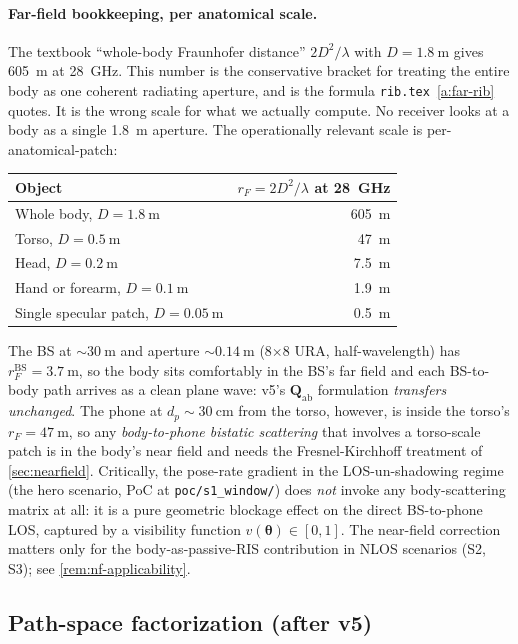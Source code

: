 \documentclass[11pt,a4paper]{article}
\theoremstyle{definition}
\newcommand{\Qabs}{\mathbf{Q}_{\mathrm{ab}}}
\newcommand{\thetab}{\bm{\theta}}
\begin{document}
\paragraph{Far-field bookkeeping, per anatomical scale.}  The
textbook ``whole-body Fraunhofer distance''
$2D^2/\lambda$ with $D=\SI{1.8}{\m}$ gives \SI{605}{\m} at
\SI{28}{\GHz}.  This number is the conservative bracket for treating
the entire body as one coherent radiating aperture, and is the
formula \texttt{rib.tex}~\cref{a:far-rib} quotes.  It is the wrong
scale for what we actually compute.  No receiver looks at a body as
a single \SI{1.8}{\m} aperture.  The operationally relevant scale
is per-anatomical-patch:
\begin{center}\small
\begin{tabular}{@{}lr@{}}
\toprule
Object & $r_F=2D^2/\lambda$ at \SI{28}{\GHz} \\
\midrule
Whole body, $D=\SI{1.8}{\m}$ & \SI{605}{\m} \\
Torso, $D=\SI{0.5}{\m}$       & \SI{47}{\m} \\
Head, $D=\SI{0.2}{\m}$        & \SI{7.5}{\m} \\
Hand or forearm, $D=\SI{0.1}{\m}$  & \SI{1.9}{\m} \\
Single specular patch, $D=\SI{0.05}{\m}$ & \SI{0.5}{\m} \\
\bottomrule
\end{tabular}
\end{center}
The BS at $\sim\SI{30}{\m}$ and aperture
$\sim\SI{0.14}{\m}$ (8$\times$8 URA, half-wavelength)
has $r_F^{\mathrm{BS}}=\SI{3.7}{\m}$, so the body sits comfortably
in the BS's far field and each BS-to-body path arrives as a clean
plane wave: v5's $\Qabs$ formulation \emph{transfers unchanged}.
The phone at $d_p\sim\SI{30}{\cm}$ from the torso, however, is
inside the torso's $r_F=\SI{47}{\m}$, so any \emph{body-to-phone
bistatic scattering} that involves a torso-scale patch is in the
body's near field and needs the Fresnel-Kirchhoff treatment of
\cref{sec:nearfield}.  Critically, the pose-rate gradient in the
LOS-un-shadowing regime (the hero scenario, PoC at
\texttt{poc/s1\_window/}) does \emph{not} invoke any
body-scattering matrix at all: it is a pure geometric blockage
effect on the direct BS-to-phone LOS, captured by a visibility
function $v(\thetab)\in[0,1]$.  The near-field correction matters
only for the body-as-passive-RIS contribution in NLOS scenarios
(S2, S3); see \cref{rem:nf-applicability}.

\subsection{Path-space factorization (after v5)}
\end{document}
